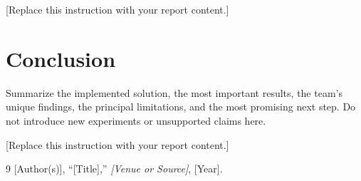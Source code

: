 \documentclass{article}
\begin{document}
[Replace this instruction with your report content.]

\section{Conclusion}
Summarize the implemented solution, the most important results, the team's unique findings, the principal limitations, and the most promising next step. Do not introduce new experiments or unsupported claims here.

[Replace this instruction with your report content.]

\begin{thebibliography}{9}
\small
{}
[Author(s)], ``[Title],'' \emph{[Venue or Source]}, [Year].
\end{thebibliography}

\end{document}
